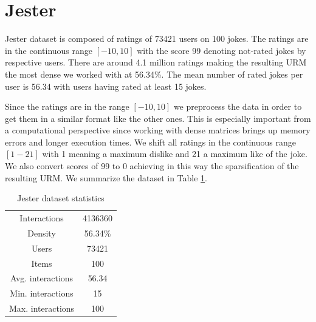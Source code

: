 \section{Jester}
Jester\cite{goldberg2001eigentaste} dataset is composed of ratings of 73421 users on 100 jokes. The ratings are in the continuous range $[-10, 10]$ with the score 99 denoting not-rated jokes by respective users. There are around 4.1 million ratings making the resulting URM the most dense we worked with at 56.34\%. The mean number of rated jokes per user is 56.34 with users having rated at least 15 jokes.

Since the ratings are in the range $[-10, 10]$ we preprocess the data in order to get them in a similar format like the other ones. This is especially important from a computational perspective since working with dense matrices brings up memory errors and longer execution times. We shift all ratings in the continuous range $[1-21]$ with 1 meaning a maximum dislike and 21 a maximum like of the joke. We also convert scores of 99 to 0 achieving in this way the sparsification of the resulting URM. We summarize the dataset in Table \ref{tab:jester_stats}.

\begin{table}[h!]
    \centering
    \begin{tabular}{c|c}
        \hline
        Interactions & 4136360 \\
        Density & 56.34\% \\
        Users & 73421 \\
        Items & 100 \\
        Avg. interactions & 56.34 \\
        Min. interactions & 15 \\
        Max. interactions & 100 \\
        \hline
    \end{tabular}
    \caption{Jester dataset statistics}
    \label{tab:jester_stats}
\end{table}

